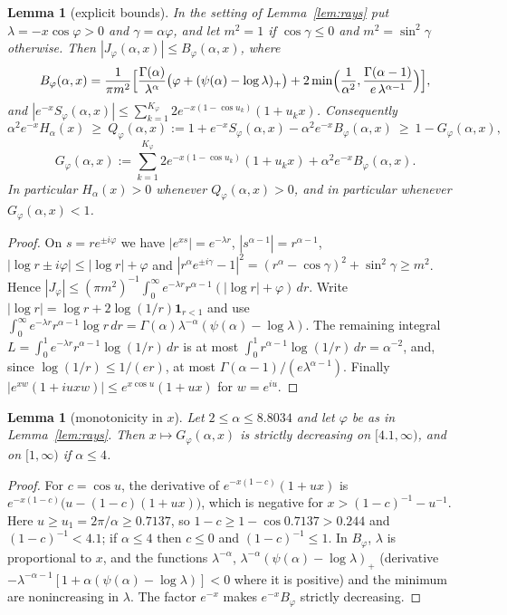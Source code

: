 \documentclass[11pt,a4paper]{article}
\theoremstyle{plain}
\newtheorem{lemma}[theorem]{Lemma}
\theoremstyle{remark}
\begin{document}
\begin{lemma}[explicit bounds]\label{lem:bounds}
In the setting of Lemma~\ref{lem:rays} put $\lambda=-x\cos\varphi>0$ and $\gamma=\alpha\varphi$,
and let $m^2=1$ if $\cos\gamma\le0$ and $m^2=\sin^2\gamma$ otherwise. Then
$|J_\varphi(\alpha,x)|\le B_\varphi(\alpha,x)$, where
\[
 B_\varphi(\alpha,x)=\frac{1}{\pi m^2}\Bigl[\frac{\Gamma(\alpha)}{\lambda^\alpha}
 \bigl(\varphi+(\psi(\alpha)-\log\lambda)_+\bigr)
 +2\min\Bigl(\frac1{\alpha^2},\frac{\Gamma(\alpha-1)}{e\,\lambda^{\alpha-1}}\Bigr)\Bigr],
\]
and $|e^{-x}S_\varphi(\alpha,x)|\le\sum_{k=1}^{K_\varphi}2e^{-x(1-\cos u_k)}(1+u_kx)$.
Consequently
\[
 \alpha^2e^{-x}H_\alpha(x)\ \ge\ Q_\varphi(\alpha,x):=1+e^{-x}S_\varphi(\alpha,x)
 -\alpha^2e^{-x}B_\varphi(\alpha,x)\ \ge\ 1-G_\varphi(\alpha,x),
\]
\[
 G_\varphi(\alpha,x):=\sum_{k=1}^{K_\varphi}2e^{-x(1-\cos u_k)}(1+u_kx)
 +\alpha^2e^{-x}B_\varphi(\alpha,x).
\]
In particular $H_\alpha(x)>0$ whenever $Q_\varphi(\alpha,x)>0$, and in particular whenever
$G_\varphi(\alpha,x)<1$.
\end{lemma}
\begin{proof}
On $s=re^{\pm i\varphi}$ we have $|e^{xs}|=e^{-\lambda r}$, $|s^{\alpha-1}|=r^{\alpha-1}$,
$|\log r\pm i\varphi|\le|\log r|+\varphi$ and
$|r^\alpha e^{\pm i\gamma}-1|^2=(r^\alpha-\cos\gamma)^2+\sin^2\gamma\ge m^2$. Hence
$|J_\varphi|\le(\pi m^2)^{-1}\int_0^\infty e^{-\lambda r}r^{\alpha-1}(|\log r|+\varphi)\,dr$. Write
$|\log r|=\log r+2\log(1/r)\mathbf 1_{r<1}$ and use
$\int_0^\infty e^{-\lambda r}r^{\alpha-1}\log r\,dr=\Gamma(\alpha)\lambda^{-\alpha}(\psi(\alpha)-\log\lambda)$.
The remaining integral $L=\int_0^1e^{-\lambda r}r^{\alpha-1}\log(1/r)\,dr$ is at most
$\int_0^1r^{\alpha-1}\log(1/r)\,dr=\alpha^{-2}$, and, since $\log(1/r)\le 1/(er)$, at most
$\Gamma(\alpha-1)/(e\lambda^{\alpha-1})$. Finally
$|e^{xw}(1+iuxw)|\le e^{x\cos u}(1+ux)$ for $w=e^{iu}$.
\end{proof}

\begin{lemma}[monotonicity in $x$]\label{lem:mono}
Let $2\le\alpha\le8.8034$ and let $\varphi$ be as in Lemma~\ref{lem:rays}. Then
$x\mapsto G_\varphi(\alpha,x)$ is strictly decreasing on $[4.1,\infty)$, and on $[1,\infty)$ if
$\alpha\le4$.
\end{lemma}
\begin{proof}
For $c=\cos u$, the derivative of $e^{-x(1-c)}(1+ux)$ is $e^{-x(1-c)}\bigl(u-(1-c)(1+ux)\bigr)$,
which is negative for $x>(1-c)^{-1}-u^{-1}$. Here $u\ge u_1=2\pi/\alpha\ge0.7137$, so
$1-c\ge1-\cos0.7137>0.244$ and $(1-c)^{-1}<4.1$; if $\alpha\le4$ then $c\le0$ and $(1-c)^{-1}\le1$.
In $B_\varphi$, $\lambda$ is proportional to $x$, and the functions $\lambda^{-\alpha}$,
$\lambda^{-\alpha}(\psi(\alpha)-\log\lambda)_+$ (derivative
$-\lambda^{-\alpha-1}[1+\alpha(\psi(\alpha)-\log\lambda)]<0$ where it is positive) and the minimum are
nonincreasing in $\lambda$. The factor $e^{-x}$ makes $e^{-x}B_\varphi$ strictly decreasing.
\end{proof}
\end{document}
